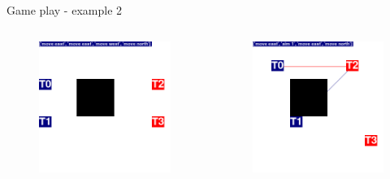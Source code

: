 \documentclass{beamer}
\begin{document}
\begin{frame}{Game play - example 2}
\begin{columns}
\begin{figure}[htp]
  \centering
  \includegraphics[width=\textwidth]{images/iteration/screenshot01.png}
\end{figure}
\begin{figure}[htp]
  \centering
  \includegraphics[width=\textwidth]{images/iteration/screenshot04.png}
\end{figure}


\end{columns}
\end{frame}
\end{document}
